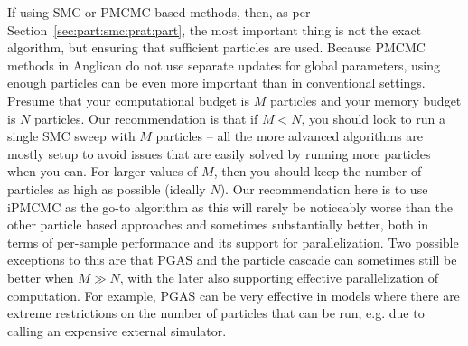If using SMC or PMCMC based methods, then, as per Section~\ref{sec:part:smc:prat:part}, the most important
thing is not the exact algorithm, but ensuring that sufficient particles are used.  Because PMCMC methods
in Anglican do not use separate updates for global parameters, using enough particles
can be even more important than in conventional settings.  Presume that your computational budget is $M$
particles and your memory budget is $N$ particles.  Our recommendation is that if $M<N$, you should look
to run a single SMC sweep with $M$ particles -- all the more advanced algorithms are mostly setup to avoid
issues that are easily solved by running more particles when you can.  For larger values of $M$, then you should
keep the number of particles as high as possible (ideally $N$).  Our recommendation here is to use iPMCMC
as the go-to algorithm as this will rarely be noticeably worse than the other particle based approaches and sometimes
substantially better, both in terms of per-sample performance and its support for parallelization.
Two possible exceptions to this are that PGAS and the particle cascade can sometimes still be better
when $M\gg N$, with the later also supporting effective parallelization of computation.  
For example, PGAS can be very effective in models where there are extreme restrictions on
the number of particles that can be run, e.g. due to calling an expensive external simulator.
